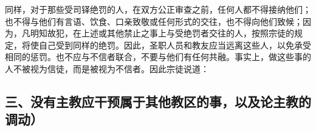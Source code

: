 同样，对于那些受司铎绝罚的人，在双方公正审查之前，任何人都不得接纳他们；也不得与他们有言语、饮食、口亲致敬或任何形式的交往，也不得向他们致候；因为，凡明知故犯，在上述或其他禁止之事上与受绝罚者交往的人，按照宗徒的规定，将使自己受到同样的绝罚。因此，圣职人员和教友应当远离这些人，以免承受相同的惩罚。也不应与不信者联合，不要与他们有任何共融。事实上，做这些事的人不被视为信徒，而是被视为不信者。因此宗徒说道：\par


\subsection{三、没有主教应干预属于其他教区的事，以及论主教的调动）}

